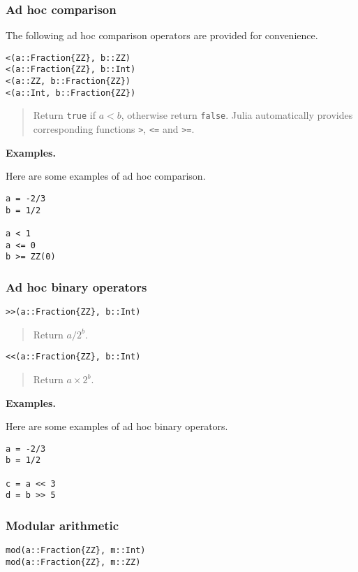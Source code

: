 \documentclass[a4paper,10pt]{article}
\newcommand{\code}{\lstinline}
\newcommand{\desc}[1]{\vspace{-3mm}\begin{quote}#1\end{quote}}
\begin{document}
{{{\subsubsection{Ad hoc comparison}

The following ad hoc comparison operators are provided for convenience.

\begin{lstlisting}
<(a::Fraction{ZZ}, b::ZZ)
<(a::Fraction{ZZ}, b::Int)
<(a::ZZ, b::Fraction{ZZ})
<(a::Int, b::Fraction{ZZ})
\end{lstlisting}

\desc{Return \code{true} if $a < b$, otherwise return \code{false}. Julia
automatically provides corresponding functions \code{>}, \code{<=} and
\code{>=}.}

\textbf{Examples.}

Here are some examples of ad hoc comparison.

\begin{lstlisting}
a = -2/3
b = 1/2

a < 1
a <= 0
b >= ZZ(0)
\end{lstlisting}

\subsubsection{Ad hoc binary operators}

\begin{lstlisting}
>>(a::Fraction{ZZ}, b::Int)
\end{lstlisting}

\desc{Return $a/2^b$.}

\begin{lstlisting}
<<(a::Fraction{ZZ}, b::Int)
\end{lstlisting}

\desc{Return $a\times 2^b$.}

\textbf{Examples.}

Here are some examples of ad hoc binary operators.

\begin{lstlisting}
a = -2/3
b = 1/2

c = a << 3
d = b >> 5
\end{lstlisting}

\subsubsection{Modular arithmetic}

\begin{lstlisting}
mod(a::Fraction{ZZ}, m::Int)
mod(a::Fraction{ZZ}, m::ZZ)
\end{lstlisting}

}}}
\end{document}
